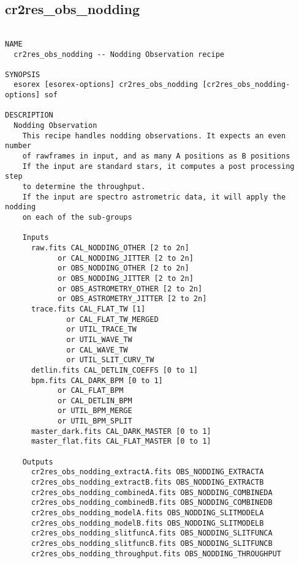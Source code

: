 \subsection{cr2res\_obs\_nodding}
\begin{verbatim}

NAME
  cr2res_obs_nodding -- Nodding Observation recipe

SYNOPSIS
  esorex [esorex-options] cr2res_obs_nodding [cr2res_obs_nodding-options] sof

DESCRIPTION
  Nodding Observation                                                     
    This recipe handles nodding observations. It expects an even number   
    of rawframes in input, and as many A positions as B positions         
    If the input are standard stars, it computes a post processing step   
    to determine the throughput.                                          
    If the input are spectro astrometric data, it will apply the nodding  
    on each of the sub-groups                                             
                                                                          
    Inputs                                                                
      raw.fits CAL_NODDING_OTHER [2 to 2n]                  
            or CAL_NODDING_JITTER [2 to 2n]                 
            or OBS_NODDING_OTHER [2 to 2n]                  
            or OBS_NODDING_JITTER [2 to 2n]                 
            or OBS_ASTROMETRY_OTHER [2 to 2n]               
            or OBS_ASTROMETRY_JITTER [2 to 2n]              
      trace.fits CAL_FLAT_TW [1]                       
              or CAL_FLAT_TW_MERGED                    
              or UTIL_TRACE_TW                         
              or UTIL_WAVE_TW                          
              or CAL_WAVE_TW                           
              or UTIL_SLIT_CURV_TW                     
      detlin.fits CAL_DETLIN_COEFFS [0 to 1]           
      bpm.fits CAL_DARK_BPM [0 to 1]                   
            or CAL_FLAT_BPM                            
            or CAL_DETLIN_BPM                          
            or UTIL_BPM_MERGE                          
            or UTIL_BPM_SPLIT                          
      master_dark.fits CAL_DARK_MASTER [0 to 1]        
      master_flat.fits CAL_FLAT_MASTER [0 to 1]        
                                                                          
    Outputs                                                               
      cr2res_obs_nodding_extractA.fits OBS_NODDING_EXTRACTA
      cr2res_obs_nodding_extractB.fits OBS_NODDING_EXTRACTB
      cr2res_obs_nodding_combinedA.fits OBS_NODDING_COMBINEDA
      cr2res_obs_nodding_combinedB.fits OBS_NODDING_COMBINEDB
      cr2res_obs_nodding_modelA.fits OBS_NODDING_SLITMODELA
      cr2res_obs_nodding_modelB.fits OBS_NODDING_SLITMODELB
      cr2res_obs_nodding_slitfuncA.fits OBS_NODDING_SLITFUNCA
      cr2res_obs_nodding_slitfuncB.fits OBS_NODDING_SLITFUNCB
      cr2res_obs_nodding_throughput.fits OBS_NODDING_THROUGHPUT
                                                                          

\end{verbatim}
